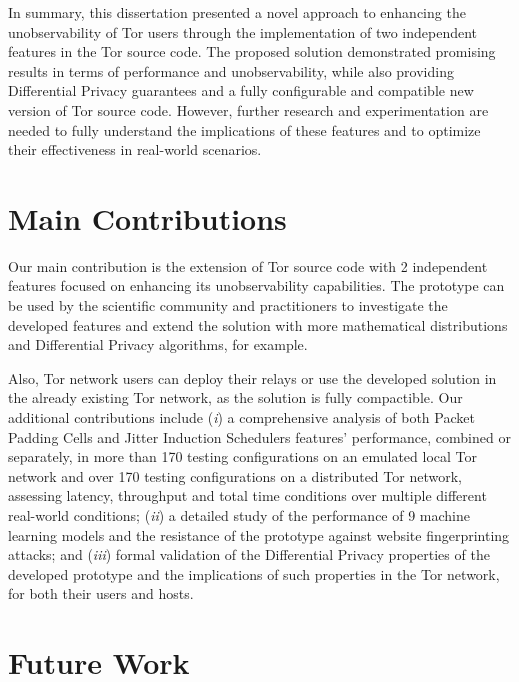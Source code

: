 In summary, this dissertation presented a novel approach to enhancing the unobservability of Tor users through the implementation of two independent features in the Tor source code. The proposed solution demonstrated promising results in terms of performance and unobservability, while also providing Differential Privacy guarantees and a fully configurable and compatible new version of Tor source code. However, further research and experimentation are needed to fully understand the implications of these features and to optimize their effectiveness in real-world scenarios.


\section{Main Contributions}\label{sec:main_conclusions}

Our main contribution is the extension of Tor source code with 2 independent features focused on enhancing its unobservability capabilities. The prototype can be used by the scientific community and practitioners to investigate the developed features and extend the solution with more mathematical distributions and Differential Privacy algorithms, for example. 

Also, Tor network users can deploy their relays or use the developed solution in the already existing Tor network, as the solution is fully compactible. Our additional contributions include  (\emph{i}) a comprehensive analysis of both Packet Padding Cells and Jitter Induction Schedulers features' performance, combined or separately, in more than 170 testing configurations on an emulated local Tor network and over 170 testing configurations on a distributed Tor network, assessing latency, throughput and total time conditions over multiple different real-world conditions; (\emph{ii}) a detailed study of the performance of 9 machine learning models and the resistance of the prototype against website fingerprinting attacks; and (\emph{iii}) formal validation of the Differential Privacy properties of the developed prototype and the implications of such properties in the Tor network, for both their users and hosts.

\section{Future Work}\label{sec:future_work}

